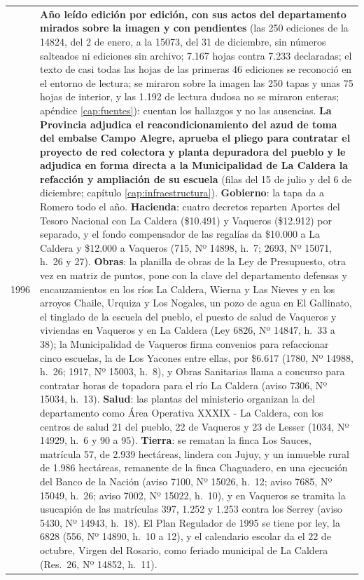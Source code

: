 \begin{longtable}{@{}p{2.7cm}p{10.3cm}@{}}
1996 & \textbf{Año leído edición por edición, con sus actos del departamento mirados sobre la imagen y con pendientes} (las 250 ediciones de la 14824, del 2 de enero, a la 15073, del 31 de diciembre, sin números salteados ni ediciones sin archivo; 7.167 hojas contra 7.233 declaradas; el texto de casi todas las hojas de las primeras 46 ediciones se reconoció en el entorno de lectura; se miraron sobre la imagen las 250 tapas y unas 75 hojas de interior, y las 1.192 de lectura dudosa no se miraron enteras; apéndice \ref{cap:fuentes}): cuentan los hallazgos y no las ausencias. \textbf{La Provincia adjudica el reacondicionamiento del azud de toma del embalse Campo Alegre, aprueba el pliego para contratar el proyecto de red colectora y planta depuradora del pueblo y le adjudica en forma directa a la Municipalidad de La Caldera la refacción y ampliación de su escuela} (filas del 15 de julio y del 6 de diciembre; capítulo \ref{cap:infraestructura}). \textbf{Gobierno}: la tapa da a Romero todo el año. \textbf{Hacienda}: cuatro decretos reparten Aportes del Tesoro Nacional con La Caldera (\$10.491) y Vaqueros (\$12.912) por separado, y el fondo compensador de las regalías da \$10.000 a La Caldera y \$12.000 a Vaqueros (715, Nº 14898, h.\ 7; 2693, Nº 15071, h.\ 26 y 27). \textbf{Obras}: la planilla de obras de la Ley de Presupuesto, otra vez en matriz de puntos, pone con la clave del departamento defensas y encauzamientos en los ríos La Caldera, Wierna y Las Nieves y en los arroyos Chaile, Urquiza y Los Nogales, un pozo de agua en El Gallinato, el tinglado de la escuela del pueblo, el puesto de salud de Vaqueros y viviendas en Vaqueros y en La Caldera (Ley 6826, Nº 14847, h.\ 33 a 38); la Municipalidad de Vaqueros firma convenios para refaccionar cinco escuelas, la de Los Yacones entre ellas, por \$6.617 (1780, Nº 14988, h.\ 26; 1917, Nº 15003, h.\ 8), y Obras Sanitarias llama a concurso para contratar horas de topadora para el río La Caldera (aviso 7306, Nº 15034, h.\ 13). \textbf{Salud}: las plantas del ministerio organizan la del departamento como Área Operativa XXXIX - La Caldera, con los centros de salud 21 del pueblo, 22 de Vaqueros y 23 de Lesser (1034, Nº 14929, h.\ 6 y 90 a 95). \textbf{Tierra}: se rematan la finca Los Sauces, matrícula 57, de 2.939 hectáreas, lindera con Jujuy, y un inmueble rural de 1.986 hectáreas, remanente de la finca Chaguadero, en una ejecución del Banco de la Nación (aviso 7100, Nº 15026, h.\ 12; aviso 7685, Nº 15049, h.\ 26; aviso 7002, Nº 15022, h.\ 10), y en Vaqueros se tramita la usucapión de las matrículas 397, 1.252 y 1.253 contra los Serrey (aviso 5430, Nº 14943, h.\ 18). El Plan Regulador de 1995 se tiene por ley, la 6828 (556, Nº 14890, h.\ 10 a 12), y el calendario escolar da el 22 de octubre, Virgen del Rosario, como feriado municipal de La Caldera (Res.\ 26, Nº 14852, h.\ 11). \\

\end{longtable}
